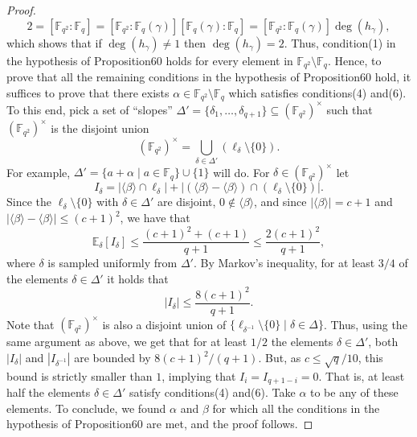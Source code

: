 \documentclass[10pt,a4paper]{article}
\begin{document}
\begin{proof}
\[2=[\mathbb F_{q^2}:\mathbb F_q]=[\mathbb F_{q^2}:\mathbb F_q(\gamma)][\mathbb F_q(\gamma):\mathbb F_q]=[\mathbb F_{q^2}:\mathbb F_q(\gamma)]\deg(h_\gamma),\]
which shows that if $\deg(h_\gamma)\ne1$ then $\deg(h_\gamma)=2$.
Thus, condition(1) in the hypothesis of Proposition60 holds for every element in $\mathbb F_{q^2}\setminus\mathbb F_q$. Hence, to prove that all the remaining conditions in the hypothesis of Proposition60 hold, it suffices to prove that there exists $\alpha\in\mathbb F_{q^2}\setminus\mathbb F_q$ which satisfies conditions(4) and(6). To this end, pick a set of ``slopes'' $\Delta'=\{\delta_1,\ldots,\delta_{q+1}\}\subseteq(\mathbb F_{q^2})^\times$ such that $(\mathbb F_{q^2})^\times$ is the disjoint union
\[(\mathbb F_{q^2})^\times=\bigcup_{\delta\in\Delta'}(\ell_\delta\setminus\{0\}).\]
For example, $\Delta'=\{a+\alpha\mid a\in\mathbb F_q\}\cup\{1\}$ will do. For $\delta\in(\mathbb F_{q^2})^\times$ let
\[I_\delta=|\langle\beta\rangle\cap\ell_\delta|+|(\langle\beta\rangle-\langle\beta\rangle)\cap(\ell_\delta\setminus\{0\})|.\]
Since the $\ell_\delta\setminus\{0\}$ with $\delta\in\Delta'$ are disjoint, $0\notin\langle\beta\rangle$, and since $|\langle\beta\rangle|=c+1$ and $|\langle\beta\rangle-\langle\beta\rangle|\leq(c+1)^2$, we have that
\[\mathbb E_\delta[I_\delta]\leq\frac{(c+1)^2+(c+1)}{q+1}\leq\frac{2(c+1)^2}{q+1},\]
where $\delta$ is sampled uniformly from $\Delta'$. By Markov's inequality, for at least $3/4$ of the elements $\delta\in\Delta'$ it holds that
\[|I_\delta|\leq\frac{8(c+1)^2}{q+1}.\]
Note that $(\mathbb F_{q^2})^\times$ is also a disjoint union of $\{\ell_{\delta^{-1}}\setminus\{0\}\mid\delta\in\Delta\}$. Thus, using the same argument as above, we get that for at least $1/2$ the elements $\delta\in\Delta'$, both $|I_\delta|$ and $|I_{\delta^{-1}}|$ are bounded by $8(c+1)^2/(q+1)$. But, as $c\leq\sqrt q/10$, this bound is strictly smaller than $1$, implying that $I_i=I_{q+1-i}=0$. That is, at least half the elements $\delta\in\Delta'$ satisfy conditions(4) and(6). Take $\alpha$ to be any of these elements. To conclude, we found $\alpha$ and $\beta$ for which all the conditions in the hypothesis of Proposition60 are met, and the proof follows.
\end{proof}
\end{document}

